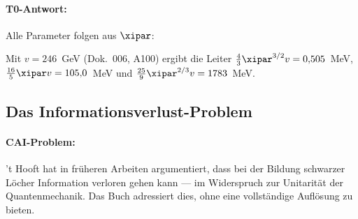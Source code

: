 \paragraph{T0-Antwort:} Alle Parameter folgen aus $\xipar$:
\begin{table}[h]
    \centering
    \caption{Freie Parameter des Standardmodells in T0}
    \label{tab:sm_parameters}
\end{table}
Mit $v = 246$~GeV (Dok.~006, A100) ergibt die Leiter $\tfrac43\xipar^{3/2}v = 0{,}505$~MeV,
$\tfrac{16}{5}\xipar v = 105{,}0$~MeV und $\tfrac{25}{9}\xipar^{2/3}v = 1783$~MeV.

\subsection{Das Informationsverlust-Problem}

\paragraph{CAI-Problem:} 't Hooft hat in früheren Arbeiten argumentiert, dass
bei der Bildung schwarzer Löcher Information verloren gehen kann — im Widerspruch
zur Unitarität der Quantenmechanik. Das Buch adressiert dies, ohne eine
vollständige Auflösung zu bieten.

